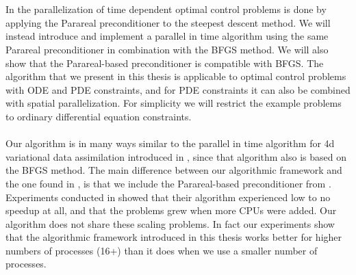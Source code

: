 \\
\\
In \cite{maday2002parareal} the parallelization of time dependent optimal control problems is done by applying the Parareal preconditioner to the steepest descent method. We will instead introduce and implement a parallel in time algorithm using the same Parareal preconditioner in combination with the BFGS method. We will also show that the Parareal-based preconditioner is compatible with BFGS. The algorithm that we present in this thesis is applicable to optimal control problems with ODE and PDE constraints, and for PDE constraints it can also be combined with spatial parallelization. For simplicity we will restrict the example problems to ordinary differential equation constraints.
\\
\\
Our algorithm is in many ways similar to the parallel in time algorithm for 4d variational data assimilation introduced in \cite{rao2016time}, since that algorithm also is based on the BFGS method. The main difference between our algorithmic framework and the one found in \cite{rao2016time}, is that we include the Parareal-based preconditioner from \cite{maday2002parareal}. Experiments conducted in \cite{rao2016time} showed that their algorithm experienced low to no speedup at all, and that the problems grew when more CPUs were added. Our algorithm does not share these scaling problems. In fact our experiments show that the algorithmic framework introduced in this thesis works better for higher numbers of processes (16+) than it does when we use a smaller number of processes.
